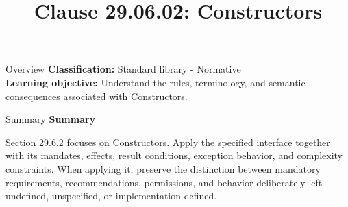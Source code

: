 \documentclass[10pt,letterpaper]{article}
\title{Clause 29.06.02: Constructors}
\author{}
\date{}
\begin{document}
\maketitle
\begin{CornellOverviewBox}{Overview}
\textbf{Classification:} Standard library - Normative\\[2pt]
\textbf{Learning objective:} Understand the rules, terminology, and semantic consequences associated with Constructors.
\end{CornellOverviewBox}\begin{CornellSummaryBox}{Summary}
{\sffamily\bfseries\color{Accent} Summary}\par\vspace{3pt}Section 29.6.2 focuses on Constructors. Apply the specified interface together with its mandates, effects, result conditions, exception behavior, and complexity constraints. When applying it, preserve the distinction between mandatory requirements, recommendations, permissions, and behavior deliberately left undefined, unspecified, or implementation-defined.
\end{CornellSummaryBox}
\end{document}

